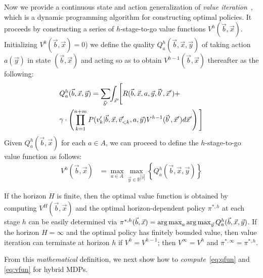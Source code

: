 \label{sec:soln}

Now we provide a continuous state and action generalization of {\it value
iteration}~\cite{bellman}, which is a dynamic programming algorithm
for constructing optimal policies.  It proceeds by constructing a
series of $h$-stage-to-go value functions $V^h(\vec{b},\vec{x})$.
Initializing $V^0(\vec{b},\vec{x}) = 0$) we define the quality
$Q_a^{h}(\vec{b},\vec{x},\vec{y})$ of taking action $a(\vec{y})$ in state
$(\vec{b},\vec{x})$ and acting so as to obtain
$V^{h-1}(\vec{b},\vec{x})$ thereafter as the following:
\vspace{-2.5mm}
{\footnotesize
\begin{align}
& Q_a^{h}(\vec{b},\vec{x},\vec{y}) = \sum_{\vec{b}'} \hspace{-1.0mm} \int_{\vec{x}'} \hspace{-1.0mm} \Bigg[ R(\vec{b},\vec{x},a,\vec{y},\vec{b}',\vec{x}') +  \label{eq:qfun} \\ 
& \gamma \cdot \left( \prod_{k=1}^{n+m} P(v_k'| \vec{b},\vec{x}, \vec{v}'_{<k}, a,\vec{y}) V^{h-1}(\vec{b}',\vec{x}') d\vec{x}' \right)  \Bigg] \nonumber
\end{align}}
Given $Q_a^h(\vec{b},\vec{x})$ for each $a \in A$, we can proceed
to define the $h$-stage-to-go value function as follows:
\begin{align}
V^{h}(\vec{b},\vec{x}) & = \max_{a \in A} \max_{\vec{y} \in \mathbb{R}^{|\vec{y}|}} \left\{ Q^{h}_a(\vec{b},\vec{x},\vec{y}) \right\} \label{eq:vfun}
\end{align}

If the horizon $H$ is finite, then the optimal value function is
obtained by computing $V^H(\vec{b},\vec{x})$ and the optimal
horizon-dependent policy $\pi^{*,h}$ at each stage $h$ can be easily
determined via $\pi^{*,h}(\vec{b},\vec{x}) = \argmax_a
\argmax_{\vec{y}} Q^h_a(\vec{b},\vec{x},\vec{y})$.  If the horizon $H
= \infty$ and the optimal policy has finitely bounded value, then
value iteration can terminate at horizon $h$ if $V^{h} = V^{h-1}$;
then $V^\infty = V^h$ and $\pi^{*,\infty} = \pi^{*,h}$.

From this \emph{mathematical} definition, we next 
show how to \emph{compute}~\eqref{eq:qfun} and \eqref{eq:vfun} 
for hybrid MDPs.
